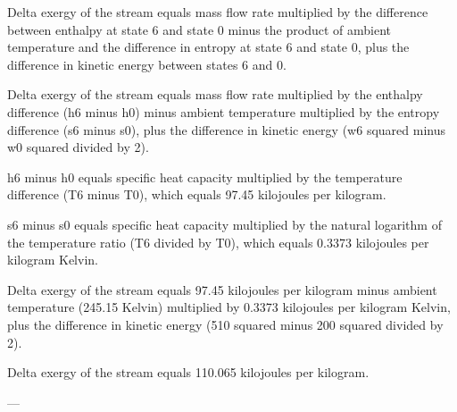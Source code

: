 Delta exergy of the stream equals mass flow rate multiplied by the difference between enthalpy at state 6 and state 0 minus the product of ambient temperature and the difference in entropy at state 6 and state 0, plus the difference in kinetic energy between states 6 and 0.  

Delta exergy of the stream equals mass flow rate multiplied by the enthalpy difference (h6 minus h0) minus ambient temperature multiplied by the entropy difference (s6 minus s0), plus the difference in kinetic energy (w6 squared minus w0 squared divided by 2).  

h6 minus h0 equals specific heat capacity multiplied by the temperature difference (T6 minus T0), which equals 97.45 kilojoules per kilogram.  

s6 minus s0 equals specific heat capacity multiplied by the natural logarithm of the temperature ratio (T6 divided by T0), which equals 0.3373 kilojoules per kilogram Kelvin.  

Delta exergy of the stream equals 97.45 kilojoules per kilogram minus ambient temperature (245.15 Kelvin) multiplied by 0.3373 kilojoules per kilogram Kelvin, plus the difference in kinetic energy (510 squared minus 200 squared divided by 2).  

Delta exergy of the stream equals 110.065 kilojoules per kilogram.  

---